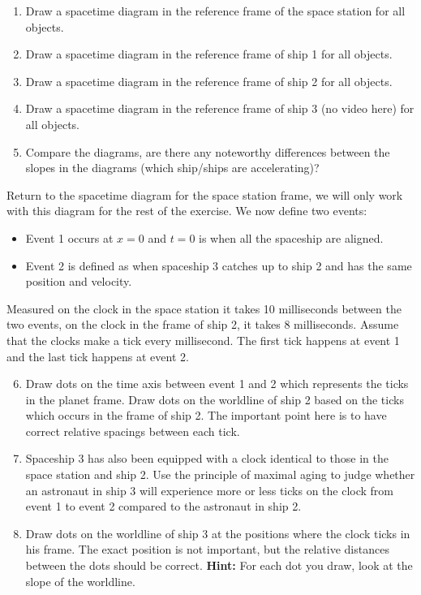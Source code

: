 {\begin{multicols}{2}
\begin{enumerate}
\item Draw a spacetime diagram in the reference frame of the space station for all objects.
\item Draw a spacetime diagram in the reference frame of ship 1 for all objects.
\item Draw a spacetime diagram in the reference frame of ship 2 for all objects.
\item Draw a spacetime diagram in the reference frame of ship 3 (no video here) for all objects.
\item Compare the diagrams, are there any noteworthy differences between the slopes in the diagrams (which ship/ships are accelerating)?
\end{enumerate}
Return to the spacetime diagram for the space station frame, we will only work with this diagram for the rest of the exercise. We now define two events:
\begin{itemize}
\item Event 1 occurs at $x=0$ and $t=0$ is when all the spaceship are aligned.
\item Event 2 is defined as when spaceship 3 catches up to ship 2 and has the same position and velocity.
\end{itemize}
Measured on the clock in the space station it takes 10 milliseconds between the two events, on the clock in the frame of ship 2, it takes 8 milliseconds. Assume that the clocks make a tick every millisecond. The first tick happens at event 1 and the last tick happens at event 2.
\begin{enumerate}
\setcounter{enumi}{5}
\item Draw dots on the time axis between event 1 and 2 which represents the ticks in the planet frame. Draw dots on the worldline of ship 2 based on the ticks which occurs in the frame of ship 2. The important point here is to have correct relative spacings between each tick.
\item Spaceship 3 has also been equipped with a clock identical to those in the space station and ship 2. Use the principle of maximal aging to judge whether an astronaut in ship 3 will experience more or less ticks on the clock from event 1 to event 2 compared to the astronaut in ship 2.
\item Draw dots on the worldline of ship 3 at the positions where the clock ticks in his frame. The exact position is not important, but the relative distances between the dots should be correct. {\bf Hint:} For each dot you draw, look at the slope of the worldline.
\end{enumerate}


\end{multicols}}
